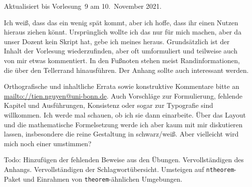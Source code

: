 \documentclass[a4paper]{article}
\begin{document}
\maketitle

\begin{footnotesize}
    Aktualisiert bis Vorlesung~9 am 10.~November 2021.

    Ich weiß, dass das ein wenig spät kommt, aber ich hoffe, dass ihr einen Nutzen hieraus ziehen könnt. Ursprünglich wollte ich das nur für mich machen, aber da unser Dozent kein Skript hat, gebe ich meines heraus. Grundsätzlich ist der Inhalt der Vorlesung wiederzufinden, aber oft umformuliert und teilweise auch von mir etwas kommentiert. In den Fußnoten stehen meist Randinformationen, die über den Tellerrand hinausführen. Der Anhang sollte auch interessant werden.

    Orthografische und inhaltliche Errata sowie konstruktive Kommentare bitte an \url{mailto://tien.nguyen@uni-bonn.de}. Auch Vorschläge zur Formulierung, fehlende Kapitel und Ausführungen, Konsistenz oder sogar zur  Typografie sind willkommen. Ich werde mal schauen, ob ich sie dann einarbeite. Über das Layout und die mathematische Formelsetzung werde ich aber kaum mit mir diskutieren lassen, insbesondere die reine Gestaltung in schwarz/weiß. Aber vielleicht wird mich noch einer umstimmen?

    Todo: Hinzufügen der fehlenden Beweise aus den Übungen. Vervollständigen des Anhangs. Vervollständigen der Schlagwortübersicht. Umsteigen auf \texttt{ntheorem}-Paket und Einrahmen von \texttt{theorem}-ähnlichen Umgebungen.
\end{footnotesize}
\end{document}
